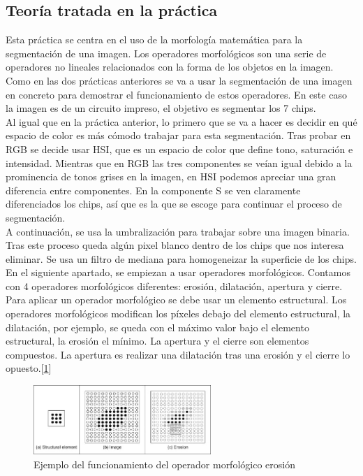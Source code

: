 \documentclass[a4paper,12pt]{report}
\begin{document}
\subsection{Teoría tratada en la práctica}

Esta práctica se centra en el uso de la morfología matemática para la segmentación de una imagen. Los operadores morfológicos son una serie de operadores no lineales relacionados con la forma de los objetos en la imagen. Como en las dos prácticas anteriores se va a usar la segmentación de una imagen en concreto para demostrar el funcionamiento de estos operadores. En este caso la imagen es de un circuito impreso, el objetivo es segmentar los 7 chips.\\

Al igual que en la práctica anterior, lo primero que se va a hacer es decidir en qué espacio de color es más cómodo trabajar para esta segmentación. Tras probar en RGB se decide usar HSI, que es un espacio de color que define tono, saturación e intensidad. Mientras que en RGB las tres componentes se veían igual debido a la prominencia de tonos grises en la imagen, en HSI podemos apreciar una gran diferencia entre componentes. En la componente S se ven claramente diferenciados los chips, así que es la que se escoge para continuar el proceso de segmentación.\\

A continuación, se usa la umbralización para trabajar sobre una imagen binaria. Tras este proceso queda algún pixel blanco dentro de los chips que nos interesa eliminar. Se usa un filtro de mediana para homogeneizar la superficie de los chips.\\

En el siguiente apartado, se empiezan a usar operadores morfológicos. Contamos con 4 operadores morfológicos diferentes: erosión, dilatación, apertura y cierre. Para aplicar un operador morfológico se debe usar un elemento estructural. Los operadores morfológicos modifican los píxeles debajo del elemento estructural, la dilatación, por ejemplo, se queda con el máximo valor bajo el elemento estructural, la erosión el mínimo. La apertura y el cierre son elementos compuestos. La apertura es realizar una dilatación tras una erosión y el cierre lo opuesto.[\ref{erosion}]\\

\begin{figure}[h]
\centering
\includegraphics[width=0.6\textwidth]{imagenes/erosion}
\caption{Ejemplo del funcionamiento del operador morfológico erosión}
\label{erosion}
\end{figure}
\end{document}
